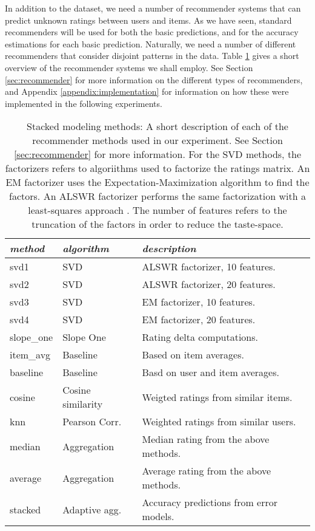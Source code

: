 In addition to the dataset, we need a number of recommender systems
that can predict unknown ratings between users and items.
As we have seen, standard recommenders will be used for both the basic predictions,
and for the accuracy estimations for each basic prediction.
Naturally, we need a number of different recommenders that consider
disjoint patterns in the data. Table \ref{table:results:methods}
gives a short overview of the recommender systems we shall employ.
See Section \ref{sec:recommender} for more information on the different
types of recommenders, and Appendix \ref{appendix:implementation}
for information on how these were implemented in the following experiments.

\begin{table}[t]
  \begin{tabular*}{\textwidth}{ l l l }
    \toprule
    \emph{method} &  \emph{algorithm} & \emph{description} \\
    \midrule
    svd1          & SVD                   & ALSWR factorizer, 10 features. \\
    svd2          & SVD                   & ALSWR factorizer, 20 features. \\
    svd3          & SVD                   & EM factorizer, 10 features. \\
    svd4          & SVD                   & EM factorizer, 20 features. \\
    slope\_one    & Slope One             & Rating delta computations. \\
    item\_avg     & Baseline              & Based on item averages. \\ 
    baseline      & Baseline              & Basd on user and item averages.\\ 
    cosine   	    & Cosine similarity     & Weigted ratings from similar items.\\ 
    knn       	  & Pearson Corr.         & Weighted ratings from similar users.\\
    \midrule
    median    	  & Aggregation           & Median rating from the above methods. \\
    average    	  & Aggregation           & Average rating from the above methods. \\
    stacked       & Adaptive agg.         & Accuracy predictions from error models. \\
    \bottomrule
  \end{tabular*}
  \caption[Stacked Modeling Methods]{
    Stacked modeling methods: A short description of each of the recommender methods
    used in our experiment. See Section \ref{sec:recommender} for more information.
    For the SVD methods, the factorizers refers to algoriithms used to factorize the ratings matrix.
    An EM factorizer uses the Expectation-Maximization algorithm to find the factors.
    An ALSWR factorizer performs the same factorization with a least-squares approach \citep{Zhou2008}.
    The number of features refers to the truncation of the factors in order to reduce the taste-space.
  }
  \label{table:results:methods}
\end{table}

